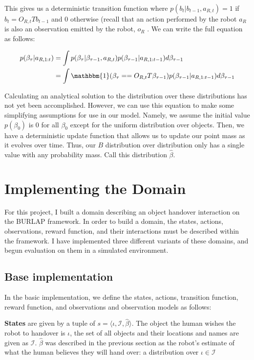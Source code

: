 \documentclass{article}
\begin{document}
This gives us a deterministic transition function where $p(b_t | b_{t-1}, a_{R,t}) = 1$ if $b_t = O_{R,t}Tb_{t-1}$ and 0 otherwise (recall that an action performed by the robot $a_R$ is also an observation emitted by the robot, $o_R$ . We can write the full equation as follows: 

\begin{align}
	p(\beta_\tau | a_{R,1:t}) &= \int p(\beta_\tau | \beta_{\tau-1}, a_{R,t}) p(\beta_{\tau-1} | a_{R,1:t-1}) d \beta_{\tau-1} \\
	&= \int \mathbbm{1}(\beta_\tau == O_{R,t} T\beta_{\tau-1}) p(\beta_{\tau-1} | a_{R,1:t-1}) d \beta_{\tau-1}
\end{align}

Calculating an analytical  solution to the distribution over these distributions has not yet been accomplished. However, we can use this equation to make some simplifying assumptions for use in our model. Namely, we assume the initial value $p(\beta_0)$ is 0 for all $\beta_0$ except for the uniform distribution over objects. Then, we have a deterministic update function that allows us to update our point mass as it evolves over time. Thus, our $B$ distribution over distribution only has a single value with any probability mass. Call this distribution $\hat \beta$. 


\section{Implementing the Domain}

For this project, I built a domain describing an object handover interaction on the BURLAP framework. In order to build a domain, the states, actions, observations, reward function, and their interactions must be described within the framework. I have implemented three different variants of these domains, and begun evaluation on them in a simulated environment. 

\subsection{Base implementation}

In the basic implementation, we define the states, actions, transition function, reward function, and observations and observation models as follows: 

\textbf{States} are given by a tuple of $ s = \langle \iota, \mathcal{I}, \hat \beta \rangle$. The object the human wishes the robot to handover is $\iota$, the set of all objects and their locations and names are given as $\mathcal{I}$. $\hat \beta$ was described in the previous section as the robot's estimate of what the human believes they will hand over: a distribution over $\iota \in \mathcal{I}$
\end{document}
